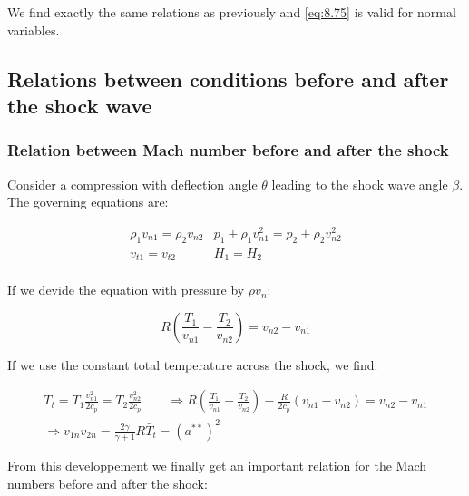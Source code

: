 	We find exactly the same relations as previously and \eqref{eq:8.75} is valid for normal variables. 
	
\subsection{Relations between conditions before and after the shock wave}
\subsubsection{Relation between Mach number before and after the shock}
	Consider a compression with deflection angle $\theta$ leading to the shock wave angle $\beta$. The governing equations are: 
	
	\begin{equation}
	\begin{array}{cc}
	\rho _1 v_{n1} = \rho _2 v_{n2} & p_1 + \rho _1 v_{n1}^2 = p_2 + \rho _2 v_{n2}^2\\
	v_{t1} = v_{t2} & H_1 = H_2\\
	\end{array}
	\end{equation}
	
	If we devide the equation with pressure by $\rho v_n$: 
	
	\begin{equation}
	R\left( \frac{T_1}{v_{n1}} - \frac{T_2}{v_{n2}} \right) = v_{n2} - v_{n1}
	\end{equation}
	
	If we use the constant total temperature across the shock, we find: 
	
	\begin{equation}
	\begin{array}{c}
	\bar{T}_t = T_1 \frac{v_{n1}^2}{2c_p} = T_2 \frac{v_{n2}^2}{2c_p} \qquad \Rightarrow R\left( \frac{T_1}{v_{n1}} - \frac{T_2}{v_{n2}} \right) - \frac{R}{2c_p}\left( v_{n1} - v_{n2} \right) = v_{n2} - v_{n1} \\
	\Rightarrow v_{1n}v_{2n} = \frac{2\gamma }{\gamma +1 } R\bar{T}_t = (a^{**})^2
	\end{array}
	\label{eq:8.80}
	\end{equation}
	
	From this developpement we finally get an important relation for the Mach numbers before and after the shock: 
	
	\begin{center}
	\end{center}
	
